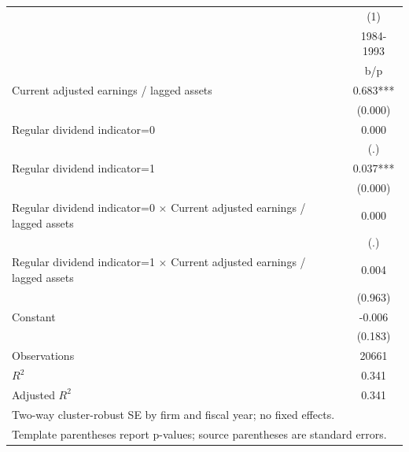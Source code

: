 {
\def\sym#1{\ifmmode^{#1}\else\(^{#1}\)\fi}
\begin{tabular}{l*{1}{c}}
\hline\hline
                    &\multicolumn{1}{c}{(1)}\\
                    &\multicolumn{1}{c}{1984-1993}\\
                    &         b/p   \\
\hline
Current adjusted earnings / lagged assets&       0.683***\\
                    &     (0.000)   \\
Regular dividend indicator=0&       0.000   \\
                    &         (.)   \\
Regular dividend indicator=1&       0.037***\\
                    &     (0.000)   \\
Regular dividend indicator=0 $\times$ Current adjusted earnings / lagged assets&       0.000   \\
                    &         (.)   \\
Regular dividend indicator=1 $\times$ Current adjusted earnings / lagged assets&       0.004   \\
                    &     (0.963)   \\
Constant            &      -0.006   \\
                    &     (0.183)   \\
\hline
Observations        &       20661   \\
\(R^{2}\)           &       0.341   \\
Adjusted \(R^{2}\)  &       0.341   \\
\hline\hline
\multicolumn{2}{l}{\footnotesize Two-way cluster-robust SE by firm and fiscal year; no fixed effects.}\\
\multicolumn{2}{l}{\footnotesize Template parentheses report p-values; source parentheses are standard errors.}\\
\end{tabular}
}

